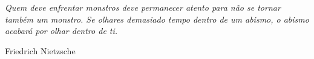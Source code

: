 \newpage
\vspace*{\fill}
\epigraph{\textit{Quem deve enfrentar monstros deve permanecer atento para
não se tornar também um monstro. Se olhares demasiado tempo dentro de um abismo,  o abismo acabará por olhar dentro de ti.}}{Friedrich Nietzsche}



\newpage

$ $
